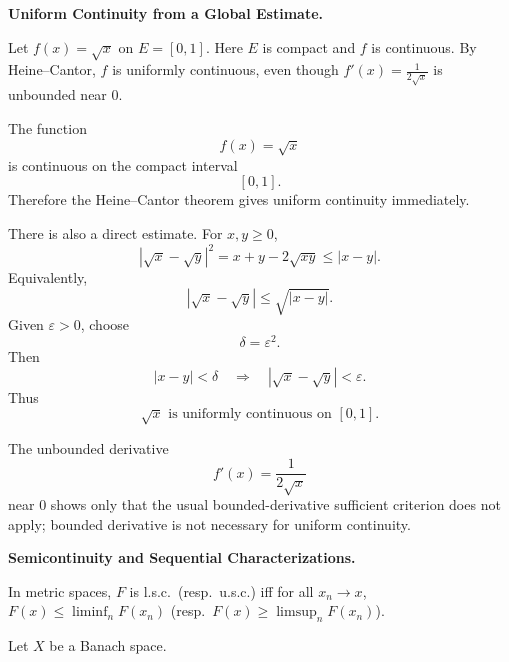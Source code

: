 \begin{problem}[CP-II-0269]
\label{prob:cp-ii-0269}
\textbf{Uniform Continuity from a Global Estimate.}

\hspace*{1.5em}Let $f(x) = \sqrt{x}$ on $E=[0,1]$.
		Here $E$ is compact and $f$ is continuous.
		By Heine--Cantor, $f$ is uniformly continuous, even though $f'(x)=\tfrac{1}{2\sqrt{x}}$ is unbounded near $0$.
\end{problem}

\begin{solution}
The function
\[
f(x)=\sqrt{x}
\]
is continuous on the compact interval
\[
[0,1].
\]
Therefore the Heine--Cantor theorem gives uniform continuity immediately.

There is also a direct estimate. For \(x,y\ge0\),
\[
|\sqrt{x}-\sqrt{y}|^2
=
x+y-2\sqrt{xy}
\le
|x-y|.
\]
Equivalently,
\[
|\sqrt{x}-\sqrt{y}|
\le
\sqrt{|x-y|}.
\]
Given \(\varepsilon>0\), choose
\[
\delta=\varepsilon^2.
\]
Then
\[
|x-y|<\delta
\quad\Longrightarrow\quad
|\sqrt{x}-\sqrt{y}|<\varepsilon.
\]
Thus
\[
\boxed{\sqrt{x}\text{ is uniformly continuous on }[0,1].}
\]

The unbounded derivative
\[
f'(x)=\frac1{2\sqrt{x}}
\]
near \(0\) shows only that the usual bounded-derivative sufficient criterion does not apply; bounded derivative is not necessary for uniform continuity.
\end{solution}


\begin{problem}[CP-II-0271]
\label{prob:cp-ii-0271}
\textbf{Semicontinuity and Sequential Characterizations.}

\hspace*{1.5em}In metric spaces, $F$ is l.s.c.\ (resp.\ u.s.c.) iff for all $x_n\to x$,
		$\displaystyle F(x)\le\liminf_n F(x_n)$ (resp.\ $\displaystyle F(x)\ge\limsup_n F(x_n)$).

	Let $X$ be a Banach space.
\end{problem}

